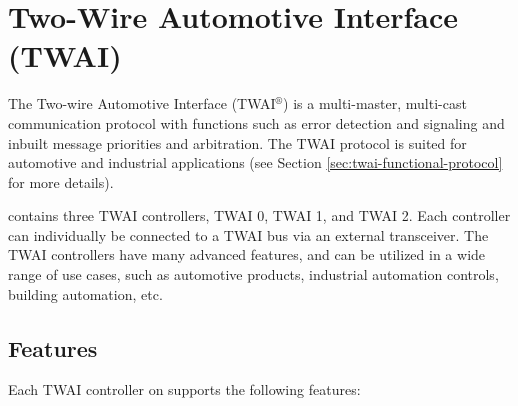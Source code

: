\documentclass[main\_\_EN.tex]{subfiles}
\begin{document}

\ifglobal
\else
    {\let\clearpage\relax \listoftodos}
    {\let\clearpage\relax \listofdonetodos}
    \tableofcontents
    \listoftables
    \listoffigures
\fi



\hypertarget{twai}{}
\chapter{Two-Wire Automotive Interface (TWAI)}
\label{mod:twai}


The Two-wire Automotive Interface (TWAI$^\circledR$) is a multi-master, multi-cast communication protocol with functions such as error detection and signaling and inbuilt message priorities and arbitration. The TWAI protocol is suited for automotive and industrial applications (see Section \ref{sec:twai-functional-protocol} for more details).

\chipname{} contains three TWAI controllers, TWAI 0, TWAI 1, and TWAI 2. Each controller can individually be connected to a TWAI bus via an external transceiver. The TWAI controllers have many advanced features, and can be utilized in a wide range of use cases, such as automotive products, industrial automation controls, building automation, etc.

\section{Features}
Each TWAI controller on \chipname{} supports the following features:
\end{document}
